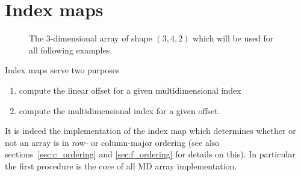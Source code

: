 \section{Index maps}

\begin{figure}[tb]
\centering
\begin{minipage}{0.3\linewidth}
\centering
{}
\end{minipage}
\hfill
\begin{minipage}{0.45\linewidth}
\caption{{\small\label{fig:array_app:array_3d}
The 3-dimensional array of shape $(3,4,2)$ which will be used for all following
examples. 
}}
\end{minipage}
\end{figure}
Index maps serve two purposes 
\begin{enumerate}
\item compute the linear offset for a given multidimensional index
\item compute the multidimensional index for a given offset.
\end{enumerate}
It is indeed the implementation of the index map which determines whether or not
an array is in row- or column-major ordering (see also
sections~\ref{sec:c_ordering} and \ref{sec:f_ordering} for details on this).
In particular the first procedure is the core of all MD array implementation.
